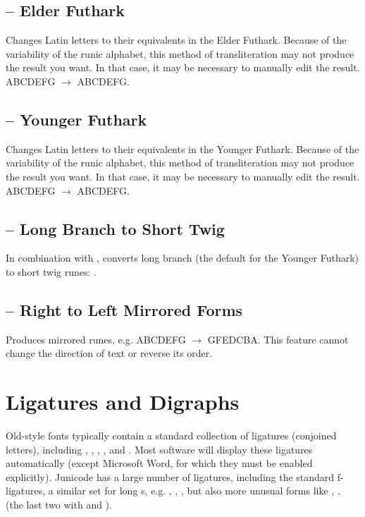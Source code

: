 \subsection{ – Elder
Futhark}
Changes Latin letters to their equivalents in the Elder Futhark. Because of the variability of the runic alphabet, this
method of transliteration may not produce the result you want. In that case, it may be necessary to manually edit the
result. ABCDEFG $\rightarrow $ {ABCDEFG}.

\subsection{ – Younger
Futhark}
Changes Latin letters to their equivalents in the Younger Futhark. Because of the variability of the runic alphabet,
this method of transliteration may not produce the result you want. In that case, it may be necessary to manually edit
the result. ABCDEFG $\rightarrow $ {ABCDEFG}.

\subsection{ –
Long Branch to Short Twig}
In combination with , converts long branch (the default for the Younger Futhark) to short twig runes:
{}.

\subsection{
– Right to Left Mirrored Forms}
Produces mirrored runes, e.g. {ABCDEFG $\rightarrow $ GFEDCBA}.
This feature cannot change the direction of text or reverse its order.

\section{Ligatures and Digraphs}

Old-style fonts typically contain a standard collection of ligatures (conjoined letters), including
, , , , and .
Most software will display these ligatures automatically (except
Microsoft Word, for which they must be enabled explicitly). Junicode has a large number of ligatures,
including the standard f-ligatures, a similar set for long s, e.g. , , , but also
more unusual forms like ,
,
(the last two with  and ).

